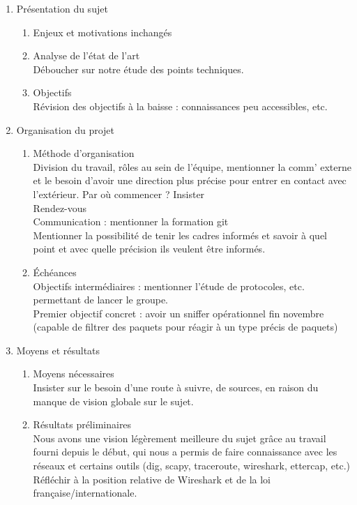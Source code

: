 \documentclass[a4paper, 11pt]{article}
\begin{document}
\begin{enumerate}
	\item Présentation du sujet
	\begin{enumerate}
		\item Enjeux et motivations inchangés
		\item Analyse de l'état de l'art \\
		Déboucher sur notre étude des points techniques.
		\item Objectifs \\
		Révision des objectifs à la baisse : connaissances peu accessibles, etc.
	\end{enumerate}
	\item Organisation du projet
	\begin{enumerate}
		\item Méthode d'organisation \\
		Division du travail, rôles au sein de l'équipe, mentionner la comm' externe et le besoin d'avoir une direction plus précise pour entrer en contact avec l'extérieur. Par où commencer ? Insister \\
		Rendez-vous \\
		Communication : mentionner la formation git \\
		Mentionner la possibilité de tenir les cadres informés et savoir à quel point et avec quelle précision ils veulent être informés.
		\item Échéances \\
		Objectifs intermédiaires : mentionner l'étude de protocoles, etc. permettant de lancer le groupe. \\
		Premier objectif concret : avoir un sniffer opérationnel fin novembre (capable de filtrer des paquets pour réagir à un type précis de paquets)
	\end{enumerate}
	\item Moyens et résultats
	\begin{enumerate}
		\item Moyens nécessaires \\
		Insister sur le besoin d'une route à suivre, de sources, en raison du manque de vision globale sur le sujet.
		\item Résultats préliminaires \\
		Nous avons une vision légèrement meilleure du sujet grâce au travail fourni depuis le début, qui nous a permis de faire connaissance avec les réseaux et certains outils (dig, scapy, traceroute, wireshark, ettercap, etc.) \\
		Réfléchir à la position relative de Wireshark et de la loi française/internationale.
	\end{enumerate}
\end{enumerate}
\end{document}
